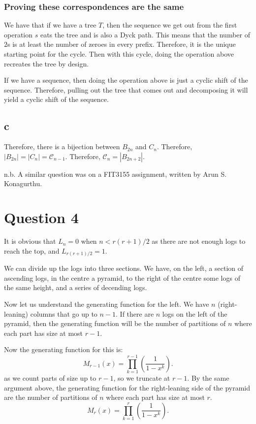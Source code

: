 \documentclass[]{article}
\theoremstyle{definition}
\numberwithin{theorem}{section}
\numberwithin{equation}{section}
\begin{document}
\subsubsection{Proving these correspondences are the same}
We have that if we have a tree $T$, then the sequence we get out from the first operation $s$ eats the tree and is also a Dyck path. This means that the number of $2$s is at least the number of zeroes in every prefix. Therefore, it is the unique starting point for the cycle. Then with this cycle, doing the operation above recreates the tree by design.

If we have a sequence, then doing the operation above is just a cyclic shift of the sequence. Therefore, pulling out the tree that comes out and decomposing it will yield a cyclic shift of the sequence. 

\subsection{c}
Therefore, there is a bijection between $B_{2n}$ and $C_n$. Therefore, $|B_{2n}| = |C_n| = \mathcal{C}_{n - 1}$. Therefore, $\mathcal{C}_n = |B_{2n + 2}|$. 

n.b. A similar question was on a FIT3155 assignment, written by Arun S. Konagurthu.
\section{Question 4}

It is obvious that $L_n = 0$ when $n < r(r+1)/2$ as there are not enough logs to reach the top, and $L_{r(r+1)/2} = 1$. 

We can divide up the logs into three sections. We have, on the left, a section of ascending logs, in the centre a pyramid, to the right of the centre some logs of the same height, and a series of decending logs.

Now let us understand the generating function for the left. We have $n$ (right-leaning) columns that go up to $n-1$. If there are $n$ logs on the left of the pyramid, then the generating function will be the number of partitions of $n$ where each part has size at most $r - 1$. 

Now the generating function for this is:
\begin{equation}
	M_{r - 1}(x) = \prod_{k = 1}^{r - 1} \left(\frac{1}{1 - x^k}\right).
\end{equation}
as we count parts of size up to $r - 1$, so we truncate at $r -1$. By the same argument above, the generating function for the right-leaning side of the pyramid are the number of partitions of $n$ where each part has size at most $r$.
\begin{equation}
	M_{r}(x) = \prod_{k = 1}^{r} \left(\frac{1}{1 - x^k}\right).
\end{equation}
\end{document}
